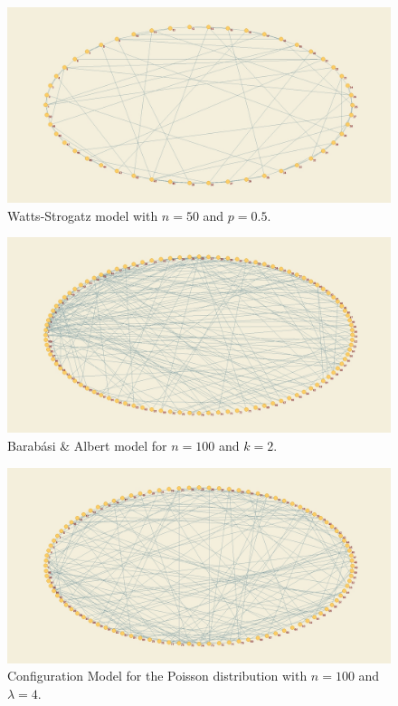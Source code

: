 \documentclass[12pt,a4paper,oneside]{article}
\numberwithin{equation}{section}
\numberwithin{equation}{section}
\theoremstyle{definition}
\begin{document}
\begin{figure}[h!]
	\centering
	\includegraphics[scale=0.25]{plots/WSn=50,p05.jpg}
	\caption{Watts-Strogatz model with $n=50$ and $p=0.5$.}
\end{figure}

\begin{figure}[h!]
	\centering
	\includegraphics[scale=0.25]{plots/BAn=100k2.jpg}
	\caption{Barabási \& Albert model for $n=100$ and $k=2$.}
\end{figure}

\begin{figure}[h!]
	\centering
	\includegraphics[scale=0.25]{plots/CMpoissn100l4.jpg}
	\caption{Configuration Model for the Poisson distribution with $n=100$ and $\lambda=4$.}
\end{figure}
\end{document}
